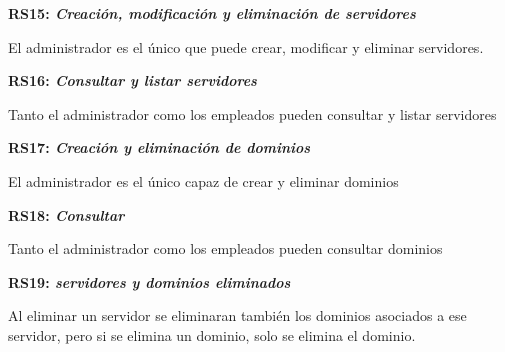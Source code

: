 \documentclass[paper=a4, fontsize=11pt, spanish]{scrartcl}
\begin{document}
\setlength{\parindent}{0em}
\textbf{RS15: \textit{Creación, modificación  y eliminación de servidores}}
\setlength{\parindent}{2em}

El administrador es el único que puede crear, modificar y eliminar servidores.

\setlength{\parindent}{0em}
\textbf{RS16: \textit{Consultar y listar servidores}}
\setlength{\parindent}{2em}

Tanto el administrador como los empleados pueden consultar y listar servidores

\setlength{\parindent}{0em}
\textbf{RS17: \textit{Creación y eliminación de dominios}}
\setlength{\parindent}{2em}

El administrador es el único capaz de crear y eliminar dominios

\setlength{\parindent}{0em}
\textbf{RS18: \textit{Consultar}}
\setlength{\parindent}{2em}

Tanto el administrador como los empleados pueden consultar dominios

\setlength{\parindent}{0em}
\textbf{RS19: \textit{servidores y dominios eliminados}}
\setlength{\parindent}{2em}

Al eliminar un servidor se eliminaran también los dominios asociados a ese servidor, pero si se elimina un dominio, solo se elimina el dominio.
\end{document}
